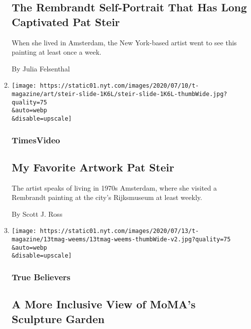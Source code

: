 \begin{enumerate}
  \hypertarget{the-rembrandt-self-portrait-that-has-long-captivated-pat-steir}{%
  \subsection{The Rembrandt Self-Portrait That Has Long Captivated Pat
  Steir}\label{the-rembrandt-self-portrait-that-has-long-captivated-pat-steir}}

  When she lived in Amsterdam, the New York-based artist went to see
  this painting at least once a week.

  By Julia Felsenthal
\item
  \href{/video/t-magazine/art/100000007194871/my-favorite-artwork-pat-steir.html}{}

  \texttt{[image: https://static01.nyt.com/images/2020/07/10/t-magazine/art/steir-slide-1K6L/steir-slide-1K6L-thumbWide.jpg?quality=75\\\&auto=webp\\\&disable=upscale]}

  \hypertarget{timesvideo}{%
  \subsubsection{TimesVideo}\label{timesvideo}}

  \hypertarget{my-favorite-artwork--pat-steir}{%
  \subsection{My Favorite Artwork \textbar{} Pat
  Steir}\label{my-favorite-artwork--pat-steir}}

  The artist speaks of living in 1970s Amsterdam, where she visited a
  Rembrandt painting at the city's Rijksmuseum at least weekly.

  By Scott J. Ross
\item
  \href{/2020/07/21/t-magazine/carrie-mae-weems-moma-garden.html}{}

  \texttt{[image: https://static01.nyt.com/images/2020/07/13/t-magazine/13tmag-weems/13tmag-weems-thumbWide-v2.jpg?quality=75\\\&auto=webp\\\&disable=upscale]}

  \hypertarget{true-believers-9}{%
  \subsubsection{True Believers}\label{true-believers-9}}

  \hypertarget{a-more-inclusive-view-of-momas-sculpture-garden}{%
  \subsection{A More Inclusive View of MoMA's Sculpture
  Garden}\label{a-more-inclusive-view-of-momas-sculpture-garden}}


\end{enumerate}
